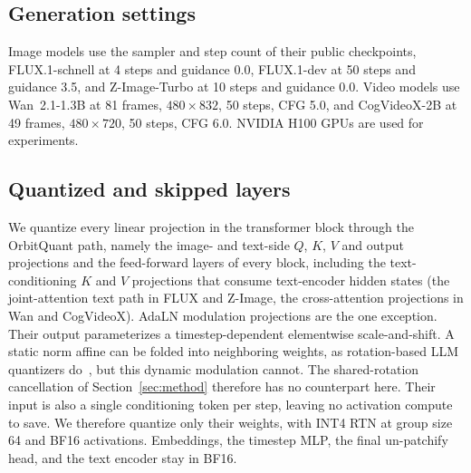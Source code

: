 \subsection{Generation settings}
\label{sec:supp-gen}
Image models use the sampler and step count of their public checkpoints, FLUX.1-schnell at 4 steps and guidance 0.0, FLUX.1-dev at 50 steps and guidance 3.5, and Z-Image-Turbo at 10 steps and guidance 0.0. Video models use Wan~2.1-1.3B at 81 frames, $480{\times}832$, 50 steps, CFG 5.0, and CogVideoX-2B at 49 frames, $480{\times}720$, 50 steps, CFG 6.0. NVIDIA H100 GPUs are used for experiments.

\subsection{Quantized and skipped layers}
\label{sec:supp-layers}
We quantize every linear projection in the transformer block through the OrbitQuant path, namely the image- and text-side $Q$, $K$, $V$ and output projections and the feed-forward layers of every block, including the text-conditioning $K$ and $V$ projections that consume text-encoder hidden states (the joint-attention text path in FLUX and Z-Image, the cross-attention projections in Wan and CogVideoX). 
AdaLN modulation projections are the one exception. Their output parameterizes a timestep-dependent elementwise scale-and-shift. A static norm affine can be folded into neighboring weights, as rotation-based LLM quantizers do~\cite{ashkboos2024quarot}, but this dynamic modulation cannot. The shared-rotation cancellation of Section~\ref{sec:method} therefore has no counterpart here. Their input is also a single conditioning token per step, leaving no activation compute to save. We therefore quantize only their weights, with INT4 RTN at group size 64 and BF16 activations. Embeddings, the timestep MLP, the final un-patchify head, and the text encoder stay in BF16.

